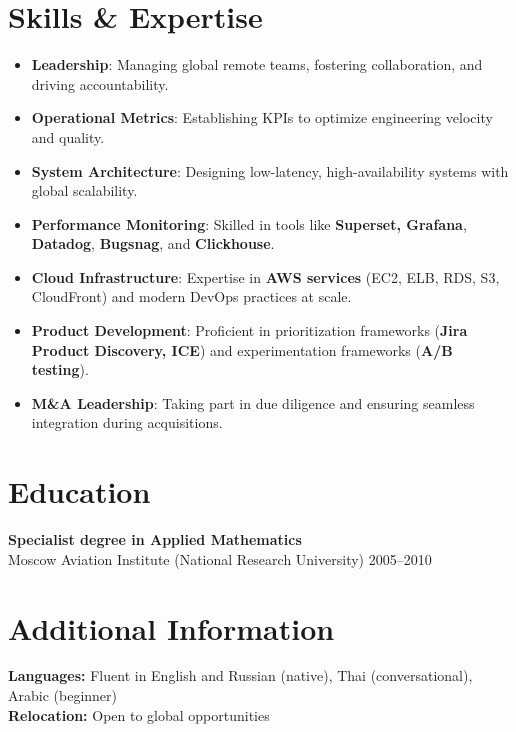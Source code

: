 \documentclass[11pt,a4paper]{article}
\begin{document}
\section*{Skills \& Expertise}
\begin{itemize}
    \item \textbf{Leadership}: Managing global remote teams, fostering collaboration, and driving accountability.
    \item \textbf{Operational Metrics}: Establishing KPIs to optimize engineering velocity and quality.
    \item \textbf{System Architecture}: Designing low-latency, high-availability systems with global scalability.
    \item \textbf{Performance Monitoring}: Skilled in tools like \textbf{Superset, Grafana}, \textbf{Datadog}, \textbf{Bugsnag}, and \textbf{Clickhouse}.
    \item \textbf{Cloud Infrastructure}: Expertise in \textbf{AWS services} (EC2, ELB, RDS, S3, CloudFront) and modern DevOps practices at scale.
    \item \textbf{Product Development}: Proficient in prioritization frameworks (\textbf{Jira Product Discovery, ICE}) and experimentation frameworks (\textbf{A/B testing}).
    \item \textbf{M\&A Leadership}: Taking part in due diligence and ensuring seamless integration during acquisitions.
\end{itemize}

\section*{Education}
\textbf{Specialist degree in Applied Mathematics} \\
Moscow Aviation Institute (National Research University) \hfill 2005--2010

\section*{Additional Information}
\textbf{Languages:} Fluent in English and Russian (native), Thai (conversational), Arabic (beginner) \\
\textbf{Relocation:} Open to global opportunities
\end{document}

